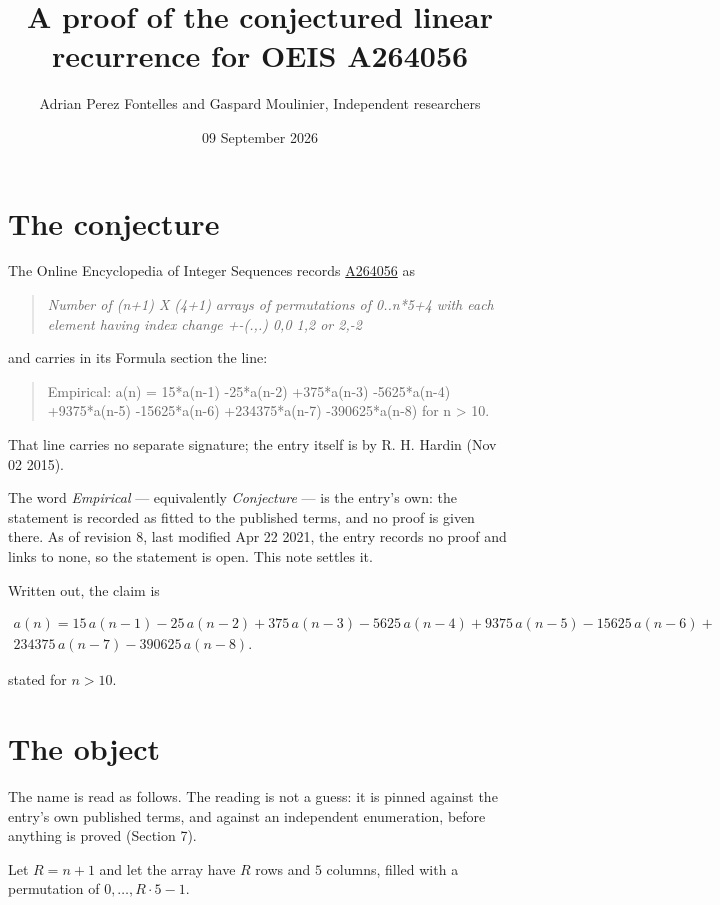 \documentclass[11pt]{article}
\title{A proof of the conjectured linear recurrence for OEIS A264056}
\author{Adrian Perez Fontelles and Gaspard Moulinier, Independent researchers}
\date{09 September 2026}
\theoremstyle{definition}
\begin{document}
\maketitle
\section{The conjecture}

The Online Encyclopedia of Integer Sequences records \href{https://oeis.org/A264056}{A264056} as

\begin{quote}\itshape Number of (n+1) X (4+1) arrays of permutations of 0..n*5+4 with each element having index change +-(.,.) 0,0 1,2 or 2,-2\end{quote}

and carries in its Formula section the line:

\begin{quote}\ttfamily Empirical: a(n) = 15*a(n-1) -25*a(n-2) +375*a(n-3) -5625*a(n-4) +9375*a(n-5) -15625*a(n-6) +234375*a(n-7) -390625*a(n-8) for n > 10.\end{quote}

That line carries no separate signature; the entry itself is by R. H. Hardin (Nov 02 2015).

The word {\itshape Empirical} --- equivalently {\itshape Conjecture} --- is the entry's own: the statement is recorded as fitted to the published terms, and no proof is given there. As of revision 8, last modified Apr 22 2021, the entry records no proof and links to none, so the statement is open. This note settles it.

Written out, the claim is

\begin{multline*} a(n) = 15\,a(n-1) - 25\,a(n-2) + 375\,a(n-3) - 5625\,a(n-4) + 9375\,a(n-5) - 15625\,a(n-6) + \\ 234375\,a(n-7) - 390625\,a(n-8). \end{multline*}

stated for $n > 10$.

\section{The object}

The name is read as follows. The reading is not a guess: it is pinned against the entry's own published terms, and against an independent enumeration, before anything is proved (Section 7).

Let $R = n + 1$ and let the array have $R$ rows and $5$ columns, filled with a permutation of $0,\dots,R\cdot5-1$.
\end{document}
